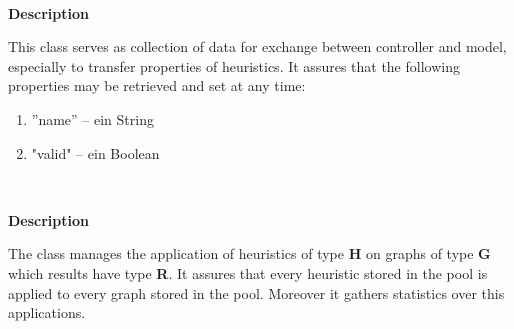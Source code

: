 	~\newpage
	
	
	\textbf{Description}
	
	This class serves as collection of data for exchange between controller and model, especially to transfer properties of heuristics. It assures that the following properties may be retrieved and set at any time:
	
	\begin{enumerate}[--]
		\item{''name'' -- ein String}
		\item{"valid" -- ein Boolean}
	\end{enumerate}
	
	~\newline
	~\newline
	~\newline
	
	\textbf{Description}
	
	The class manages the application of heuristics of type \textbf{H} on graphs of type \textbf{G} which results have type \textbf{R}. It assures that every heuristic stored in the pool is applied to every graph stored in the pool. Moreover it gathers statistics over this applications.
	
